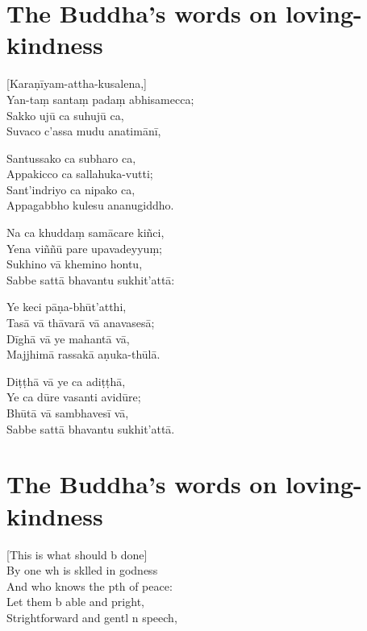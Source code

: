 \clearpage

\chapter[Loving-kindness]{The Buddha's words on loving-kindness}%

\begin{leader}
\end{leader}

[Karaṇīyam-attha-kusalena,]\\
Yan-taṃ santaṃ padaṃ abhisamecca;\\
Sakko ujū ca suhujū ca,\\
Suvaco c'assa mudu anatimānī,

Santussako ca subharo ca,\\
Appakicco ca sallahuka-vutti;\\
Sant'indriyo ca nipako ca,\\
Appagabbho kulesu ananugiddho.

Na ca khuddaṃ samācare kiñci,\\
Yena viññū pare upavadeyyuṃ;\\
Sukhino vā khemino hontu,\\
Sabbe sattā bhavantu sukhit'attā:

Ye keci pāṇa-bhūt'atthi,\\
Tasā vā thāvarā vā anavasesā;\\
Dīghā vā ye mahantā vā,\\
Majjhimā rassakā aṇuka-thūlā.

Diṭṭhā vā ye ca adiṭṭhā,\\
Ye ca dūre vasanti avidūre;\\
Bhūtā vā sambhavesī vā,\\
Sabbe sattā bhavantu sukhit'attā.

\clearpage

\chapter[Loving-kindness]{The Buddha's words on loving-kindness}%

\begin{leader}
\end{leader}

[This is what should b done]\\
By one wh is sklled in godness\\
And who knows the pth of peace:\\
Let them b able and pright,\\
Strightforward and gentl n speech,

